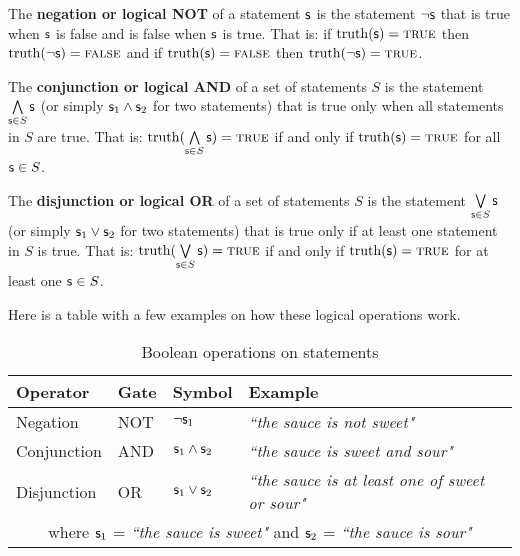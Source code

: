 \documentclass[11pt,letterpaper,fleqn]{memoir} %
\begin{document}
\begin{mathSection}
	\begin{defn}
		The \textbf{negation or logical NOT} of a statement $\mathsf{s}$ is the statement $\neg\mathsf{s}$ that is true when $\mathsf{s}$ is false and is false when $\mathsf{s}$ is true. That is: if $\operatorname{truth}(\mathsf{s}) = \textsc{true}$ then $\operatorname{truth}(\neg \mathsf{s}) = \textsc{false}$ and if $\operatorname{truth}(\mathsf{s}) = \textsc{false}$ then $\operatorname{truth}(\neg \mathsf{s}) = \textsc{true}$.
	\end{defn}
	
	\begin{defn}
		The \textbf{conjunction or logical AND} of a set of statements $S$ is the statement $\bigwedge\limits_{\mathsf{s} \in S} \mathsf{s}$ (or simply $\mathsf{s}_1 \wedge \mathsf{s}_2$ for two statements) that is true only when all statements in $S$ are true. That is: $\operatorname{truth}(\bigwedge\limits_{\mathsf{s} \in S} \mathsf{s}) = \textsc{true}$ if and only if $\operatorname{truth}(\mathsf{s}) = \textsc{true}$ for all $\mathsf{s} \in S$.
	\end{defn}
	
	\begin{defn}
		The \textbf{disjunction or logical OR} of a set of statements $S$ is the statement $\bigvee\limits_{\mathsf{s} \in S} \mathsf{s}$ (or simply $\mathsf{s}_1 \vee \mathsf{s}_2$ for two statements) that is true only if at least one statement in $S$ is true. That is: $\operatorname{truth}(\bigvee\limits_{\mathsf{s} \in S} \mathsf{s}) = \textsc{true}$ if and only if $\operatorname{truth}(\mathsf{s}) = \textsc{true}$ for at least one $\mathsf{s} \in S$.
	\end{defn}
\end{mathSection}

Here is a table with a few examples on how these logical operations work.
\begin{table}[h]
	\centering
	\begin{tabular}{p{} p{} p{} p{}}
		Operator & Gate & Symbol & Example \\ 
		\hline 
		Negation & NOT & $\neg \mathsf{s}_1$ &  \emph{``the sauce is not sweet"} \\ 
		Conjunction & AND & $\mathsf{s}_1 \wedge \mathsf{s}_2$ & \emph{``the sauce is sweet and sour"} \\ 
		Disjunction & OR & $\mathsf{s}_1 \vee \mathsf{s}_2$ & \emph{``the sauce is at least one of sweet or sour"}\\
		\multicolumn{4}{c}{  where $\mathsf{s}_1$ = \emph{``the sauce is sweet"} and $\mathsf{s}_2$ = \emph{``the sauce is sour"}}
	\end{tabular} 
	\caption{Boolean operations on statements}
\end{table}
\end{document}
